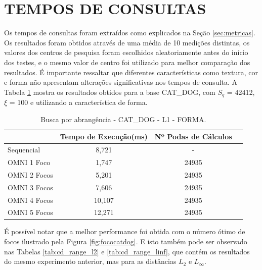 \section{TEMPOS DE CONSULTAS}
\label{sec:temp_cons}
Os tempos de consultas foram extraídos como explicados na Seção \ref{sec:metricas}. Os resultados foram obtidos através de uma média de 10 medições distintas, os valores dos centros de pesquisa foram escolhidos aleatoriamente antes
do início dos testes, e o mesmo valor de centro foi utilizado para melhor comparação dos resultados. É importante ressaltar que diferentes características como textura, cor e forma não apresentam alterações significativas
nos tempos de consulta. A Tabela \ref{tab:cd_range_l1} mostra os resultados obtidos para a base CAT\_DOG, com $S_q$ = 42412, $\xi$ = 100 e utilizando a característica de forma.

\begin{table}[!htb]
    \centering
    \caption[Busca por abrangência - CAT\_DOG - L1 - FORMA]{Busca por abrangência - CAT\_DOG - L1 - FORMA.
    \label{tab:cd_range_l1}}
   \begin{tabular}{l c c c}
        \midrule
            &Tempo de Execução(ms)&Nº Podas de Cálculos\\
        \midrule
            Sequencial & 8,721 & - \\
            OMNI 1 Foco & 1,747 & 24935 \\
            OMNI 2 Focos & 5,201 & 24935 \\
            OMNI 3 Focos & 7,606 & 24935 \\
            OMNI 4 Focos & 10,107 & 24935 \\
            OMNI 5 Focos & 12,271 & 24935 \\
        \bottomrule
    \end{tabular}
\end{table}

É possível notar que a melhor performance foi obtida com o número ótimo de focos ilustrado pela Figura \ref{fig:fococatdog}. E isto também
pode ser observado nas Tabelas \ref{tab:cd_range_l2} e \ref{tab:cd_range_linf}, que contém os resultados do mesmo experimento anterior, mas para as distâncias
$L_2$ e $L_{\infty}$.

